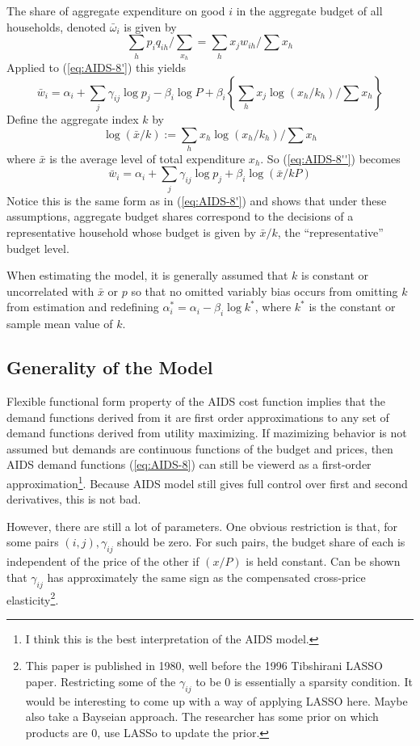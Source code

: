 The share of aggregate expenditure on good $i$ in the aggregate budget of all households, denoted $\bar{\omega}_i$ is given by 
\[\sum_h p_i q_{ih} \bigg/\sum_{x_h} = \sum_h x_j w_{ih}\bigg/\sum x_h\]
Applied to (\ref{eq:AIDS-8'}) this yields 
\begin{equation}
	\label{eq:AIDS-8''}
	\bar{w}_i = \alpha_i + \sum_j \gamma_{ij} \log p_j - \beta_i \log P + \beta_i \left\{\sum_h x_j \log (x_h/k_h)\bigg/\sum x_h\right\}
\end{equation}
Define the aggregate index $k$ by
\begin{equation}
	\label{eq:AIDS-13}
	\log(\bar{x}/k) := \sum_h x_h \log(x_h/k_h)\bigg/\sum x_h
\end{equation}
where $\bar{x}$ is the average level of total expenditure $x_h$. So (\ref{eq:AIDS-8''}) becomes 
\begin{equation}
	\label{eq:AIDS-8'''}
	\bar{w}_i = \alpha_i +\sum_j \gamma_{ij} \log p_j + \beta_i \log(\bar{x}/kP)
\end{equation}
Notice this is the same form as in (\ref{eq:AIDS-8'}) and shows that under these assumptions, aggregate budget shares correspond to the decisions of a representative household whose budget is given by $\bar{x}/k$, the ``representative'' budget level.

When estimating the model, it is generally assumed that $k$ is constant or uncorrelated with $\bar{x}$ or $p$ so that no omitted variably bias occurs from omitting $k$ from estimation and redefining $\alpha_i^* = \alpha_i - \beta_i \log k^*$, where $k^*$ is the constant or sample mean value of $k$.

\subsection{Generality of the Model}

Flexible functional form property of the AIDS cost function implies that the demand functions derived from it are first order approximations to any set of demand functions derived from utility maximizing. If mazimizing behavior is not assumed but demands are continuous functions of the budget and prices, then AIDS demand functions (\ref{eq:AIDS-8}) can still be viewerd as a first-order approximation\footnote{I think this is the best interpretation of the AIDS model.}. Because AIDS model still gives full control over first and second derivatives, this is not bad. 

However, there are still a lot of parameters. One obvious restriction is that, for some pairs $(i,j), \gamma_{ij}$ should be zero. For such pairs, the budget share of each is independent of the price of the other if $(x/P)$ is held constant. Can be shown that $\gamma_{ij}$ has approximately the same sign as the compensated cross-price elasticity\footnote{This paper is published in 1980, well before the 1996 Tibshirani LASSO paper. Restricting some of the $\gamma_{ij}$ to be 0 is essentially a sparsity condition. It would be interesting to come up with a way of applying LASSO here. Maybe also take a Bayseian approach. The researcher has some prior on which products are 0, use LASSo to update the prior.}. 

